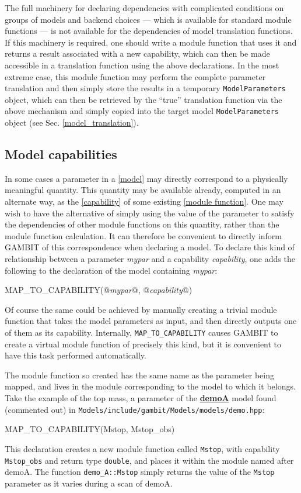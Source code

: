 \documentclass[pdftex,twocolumn,epjc3_preprint,runningheads]{svjour3}
\renewcommand{\_}{\discretionary{\underscore}{}{\underscore}}
\newcommand\cpp[1]{{\lstinline!#1!}}  %
\newcommand\term[1]{{\lstset{style=terminal}\lstinline!#1!\lstset{style=cpp}}}
\newcommand{\cross}[1]{\ref{#1}}
\newcommand{\doublecrosssf}[2]{\hyperref[#2]{\textbf{\textsf{#1}}}}
\newcommand{\metavarf}[1]{\textit{\color{darkgreen}\footnotesize\textrm{#1}}}
\newcommand{\metavar}{\metavarf}
\newcommand{\gambit}{\textsf{GAMBIT}\xspace}
\newcommand{\GB}{\gambit}
\begin{document}
The full machinery for declaring dependencies with complicated conditions on groups of models and backend choices --- which is available for standard module functions --- is not available for the dependencies of model translation functions. If this machinery is required, one should write a module function that uses it and returns a result associated with a new capability, which can then be made accessible in a translation function using the above declarations. In the most extreme case, this module function may perform the complete parameter translation and then simply store the results in a temporary \cpp{ModelParameters} object, which can then be retrieved by the ``true'' translation function via the above mechanism and simply copied into the target model \cpp{ModelParameters} object (see Sec. \ref{model_translation}).
%
\subsection{Model capabilities}
%
In some cases a parameter in a \cross{model} may directly correspond to a physically meaningful quantity.  This quantity may be available already, computed in an alternate way, as the \cross{capability} of some existing \cross{module function}.  One may wish to have the alternative of simply using the value of the parameter to satisfy the dependencies of other module functions on this quantity, rather than the module function calculation. It can therefore be convenient to directly inform \GB of this correspondence when declaring a model. To declare this kind of relationship between a parameter \metavar{my\_par} and a capability \metavar{capability}, one adds the following to the declaration of the model containing \metavar{my\_par}:
\begin{lstcpp}
MAP_TO_CAPABILITY(@\metavar{my\_par}@, @\metavar{capability}@)
\end{lstcpp}
Of course the same could be achieved by manually creating a trivial module function that takes the model parameters as input, and then directly outputs one of them as its capability. Internally, \cpp{MAP_TO_CAPABILITY} causes \GB to create a virtual module function of precisely this kind, but it is convenient to have this task performed automatically.

The module function so created has the same name as the parameter being mapped, and lives in the module corresponding to the model to which it belongs.  Take the example of the top mass, a parameter of the \doublecrosssf{demo\_A}{demos} model found (commented out) in \term{Models/include/gambit/Models/models/demo.hpp}:
\begin{lstcpp}
MAP_TO_CAPABILITY(Mstop, Mstop_obs)
\end{lstcpp}
This declaration creates a new module function called \cpp{Mstop}, with capability \cpp{Mstop_obs} and return type \cpp{double}, and places it within the module named after \textsf{demo\_A}.  The function \cpp{demo_A::Mstop} simply returns the value of the \cpp{Mstop} parameter as it varies during a scan of \textsf{demo\_A}.
\end{document}
